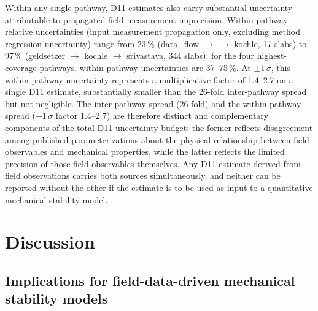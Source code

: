 \documentclass[hess, manuscript]{copernicus}
\begin{document}
Within any single pathway, D11 estimates also carry substantial uncertainty attributable to propagated field measurement imprecision. Within-pathway relative uncertainties (input measurement propagation only, excluding method regression uncertainty) range from 23\,\% (data\_flow $\to$ \citeauthor{wautier2015} $\to$ kochle, 17 slabs) to 97\,\% (geldsetzer $\to$ kochle $\to$ srivastava, 344 slabs); for the four highest-coverage pathways, within-pathway uncertainties are 37--75\,\%. At $\pm$1\,$\sigma$, this within-pathway uncertainty represents a multiplicative factor of 1.4--2.7 on a single D11 estimate, substantially smaller than the 26-fold inter-pathway spread but not negligible. The inter-pathway spread (26-fold) and the within-pathway spread ($\pm$1\,$\sigma$ factor 1.4--2.7) are therefore distinct and complementary components of the total D11 uncertainty budget: the former reflects disagreement among published parameterizations about the physical relationship between field observables and mechanical properties, while the latter reflects the limited precision of those field observables themselves. Any D11 estimate derived from field observations carries both sources simultaneously, and neither can be reported without the other if the estimate is to be used as input to a quantitative mechanical stability model.

\FloatBarrier


\section{Discussion}

\subsection{Implications for field-data-driven mechanical stability models}
\label{sec:discussion_implications}
\end{document}
